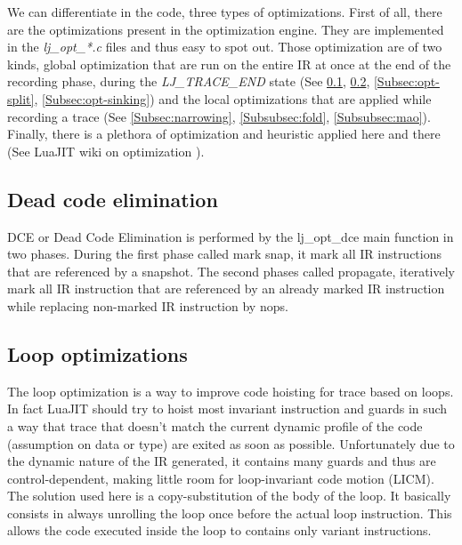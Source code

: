 We can differentiate in the code, three types of optimizations.
First of all, there are the optimizations present in the optimization engine.
They are implemented in the \emph{lj\_opt\_*.c} files and thus easy to spot out.
Those optimization are of two kinds, global optimization that are run on the
entire IR at once at the end of the recording phase, during the
\emph{LJ\_TRACE\_END} state (See \ref{Subsec:opt-dce}, \ref{Subsec:opt-loop},
\ref{Subsec:opt-split}, \ref{Subsec:opt-sinking}) and the local optimizations
that are applied while recording a trace (See \ref{Subsec:narrowing},
\ref{Subsubsec:fold}, \ref{Subsubsec:mao}). Finally, there is a plethora of
optimization and heuristic applied here and there (See LuaJIT wiki on
optimization \cite{luajit-opt}).


\subsection{Dead code elimination}
\label{Subsec:opt-dce}

DCE or Dead Code Elimination is performed by the lj\_opt\_dce main function
in two phases. During the first phase called mark snap, it mark all IR
instructions that are referenced by a snapshot. The second phases called
propagate, iteratively mark all IR instruction that are referenced by an already
marked IR instruction while replacing non-marked IR instruction by nops.


\subsection{Loop optimizations}
\label{Subsec:opt-loop}

The loop optimization is a way to improve code hoisting for trace based on
loops. In fact LuaJIT should try to hoist most invariant instruction and guards
in such a way that trace that doesn't match the current dynamic profile of
the code (assumption on data or type) are exited as soon as possible.
Unfortunately due to the dynamic nature of the IR generated, it contains many
guards and thus are control-dependent, making little room for loop-invariant
code motion (LICM). The solution used here is a copy-substitution of the body
of the loop. It basically consists in always unrolling the loop once before the
actual loop instruction. This allows the code executed inside the loop to
contains only variant instructions.

